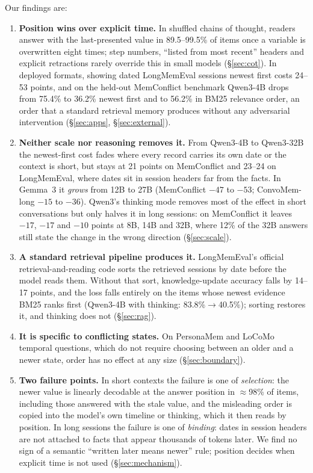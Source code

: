 \documentclass[11pt]{article}
\begin{document}
Our findings are:
\begin{enumerate}
  \item \textbf{Position wins over explicit time.} In shuffled chains of thought, readers answer with the last-presented value in 89.5--99.5\% of items once a variable is overwritten eight times; step numbers, ``listed from most recent'' headers and explicit retractions rarely override this in small models (\S\ref{sec:cot}). In deployed formats, showing dated LongMemEval sessions newest first costs 24--53 points, and on the held-out MemConflict benchmark \citep{tao2026memconflict} Qwen3-4B drops from 75.4\% to 36.2\% newest first and to 56.2\% in BM25 relevance order, an order that a standard retrieval memory produces without any adversarial intervention (\S\ref{sec:apps}, \S\ref{sec:external}).
  \item \textbf{Neither scale nor reasoning removes it.} From Qwen3-4B to Qwen3-32B the newest-first cost fades where every record carries its own date or the context is short, but stays at 21 points on MemConflict and 23--24 on LongMemEval, where dates sit in session headers far from the facts. In Gemma~3 it \emph{grows} from 12B to 27B (MemConflict $-47$ to $-53$; ConvoMem-long $-15$ to $-36$). Qwen3's thinking mode removes most of the effect in short conversations but only halves it in long sessions: on MemConflict it leaves $-17$, $-17$ and $-10$ points at 8B, 14B and 32B, where 12\% of the 32B answers still state the change in the wrong direction (\S\ref{sec:scale}).
  \item \textbf{A standard retrieval pipeline produces it.} LongMemEval's official retrieval-and-reading code sorts the retrieved sessions by date before the model reads them. Without that sort, knowledge-update accuracy falls by 14--17 points, and the loss falls entirely on the items whose newest evidence BM25 ranks first (Qwen3-4B with thinking: 83.8\%$\rightarrow$40.5\%); sorting restores it, and thinking does not (\S\ref{sec:rag}).
  \item \textbf{It is specific to conflicting states.} On PersonaMem \citep{jiang2025personamem} and LoCoMo \citep{maharana2024locomo} temporal questions, which do not require choosing between an older and a newer state, order has no effect at any size (\S\ref{sec:boundary}).
  \item \textbf{Two failure points.} In short contexts the failure is one of \emph{selection}: the newer value is linearly decodable at the answer position in $\approx$98\% of items, including those answered with the stale value, and the misleading order is copied into the model's own timeline or thinking, which it then reads by position. In long sessions the failure is one of \emph{binding}: dates in session headers are not attached to facts that appear thousands of tokens later. We find no sign of a semantic ``written later means newer'' rule; position decides when explicit time is not used (\S\ref{sec:mechanism}).

\end{enumerate}
\end{document}
